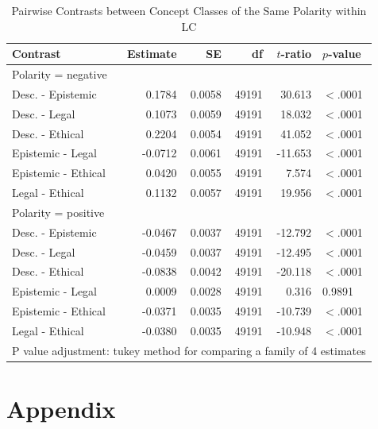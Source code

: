\documentclass{article}
\begin{document}
\begin{table}[ht]
\centering
\begin{tabular}{lrrrrl}
  \toprule
Contrast & Estimate & SE & df & $t$-ratio & $p$-value \\ 
\midrule
\multicolumn{6}{l}{Polarity = negative}\\
\cmidrule{1-1}
\rowcolor{gray!25}Desc. - Epistemic & 0.1784 & 0.0058 & 49191 & 30.613 & $<$.0001 \\ 
  Desc. - Legal & 0.1073 & 0.0059 & 49191 & 18.032 & $<$.0001 \\ 
  \rowcolor{gray!25}Desc. - Ethical & 0.2204 & 0.0054 & 49191 & 41.052 & $<$.0001 \\ 
  Epistemic - Legal & -0.0712 & 0.0061 & 49191 & -11.653 & $<$.0001 \\ 
  \rowcolor{gray!25}Epistemic - Ethical & 0.0420 & 0.0055 & 49191 & 7.574 & $<$.0001 \\ 
  Legal - Ethical & 0.1132 & 0.0057 & 49191 & 19.956 & $<$.0001 \\ 
 \midrule
\multicolumn{6}{l}{Polarity = positive}\\
\cmidrule{1-1}
\rowcolor{gray!25}Desc. - Epistemic & -0.0467 & 0.0037 & 49191 & -12.792 & $<$.0001 \\ 
  Desc. - Legal & -0.0459 & 0.0037 & 49191 & -12.495 & $<$.0001 \\ 
  \rowcolor{gray!25}Desc. - Ethical & -0.0838 & 0.0042 & 49191 & -20.118 & $<$.0001 \\ 
  Epistemic - Legal & 0.0009 & 0.0028 & 49191 & 0.316 & 0.9891 \\ 
  \rowcolor{gray!25}Epistemic - Ethical & -0.0371 & 0.0035 & 49191 & -10.739 & $<$.0001 \\ 
  Legal - Ethical & -0.0380 & 0.0035 & 49191 & -10.948 & $<$.0001 \\ 
   \bottomrule
\multicolumn{6}{l}{{\footnotesize P value adjustment: tukey method for comparing a family of 4 estimates}}\\
\end{tabular}
\caption{Pairwise Contrasts between Concept Classes of the Same Polarity within LC}
\end{table}



\section{Appendix}
\label{sec:appendix}
\end{document}
